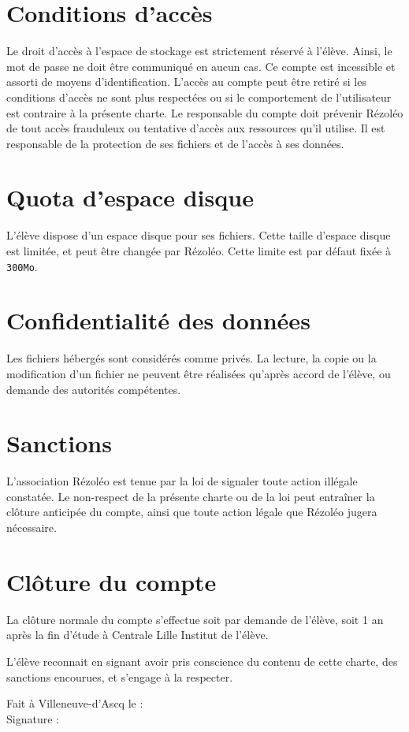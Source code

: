 \documentclass[12pt, a4paper]{article}
\begin{document}
\section{Conditions d'accès}
Le droit d'accès à l'espace de stockage est strictement réservé à l'élève. Ainsi, le mot de passe ne doit être communiqué en aucun cas. Ce compte est incessible et assorti de moyens d'identification. L'accès au compte peut être retiré si les conditions d'accès ne sont plus respectées ou si le comportement de l'utilisateur est contraire à la présente charte. Le responsable du compte doit prévenir Rézoléo de tout accès frauduleux ou tentative d'accès aux ressources qu'il utilise. Il est responsable de la protection de ses fichiers et de l'accès à ses données.

\section{Quota d'espace disque}
L'élève dispose d'un espace disque pour ses fichiers. Cette taille d'espace disque est limitée, et peut être changée par Rézoléo. Cette limite est par défaut fixée à \texttt{300Mo}.

\section{Confidentialité des données}
Les fichiers hébergés sont considérés comme privés. La lecture, la copie ou la modification d'un fichier ne peuvent être réalisées qu'après accord de l'élève, ou demande des autorités compétentes.

\section{Sanctions}
L'association Rézoléo est tenue par la loi de signaler toute action illégale constatée. Le non-respect de la présente charte ou de la loi peut entraîner la clôture anticipée du compte, ainsi que toute action légale que Rézoléo jugera nécessaire.

\section{Clôture du compte}
La clôture normale du compte s'effectue soit par demande de l'élève, soit 1 an après la fin d'étude à Centrale Lille Institut de l'élève.

\vspace*{2cm}

\noindent L'élève reconnait en signant avoir pris conscience du contenu de cette charte, des sanctions encourues, et s'engage à la respecter.

\vspace*{0.5cm}

\begin{flushright}
	\begin{minipage}{0.5\linewidth}
		Fait à Villeneuve-d'Ascq le : \dotfill\\
		Signature :
	\end{minipage}
\end{flushright}
\end{document}
